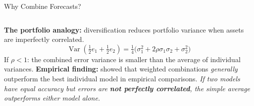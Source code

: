\documentclass[aspectratio=169, 11pt]{beamer}
\begin{document}
\begin{frame}{Why Combine Forecasts?}
  \begin{columns}[T]
      \textbf{The portfolio analogy:} diversification reduces portfolio
      variance when assets are imperfectly correlated.
      \[
        \operatorname{Var}\!\left(\tfrac{1}{2}e_1 + \tfrac{1}{2}e_2\right)
        = \tfrac{1}{4}\bigl(\sigma_1^2 + 2\rho\sigma_1\sigma_2 + \sigma_2^2\bigr)
      \]
      If $\rho < 1$: the combined error variance is smaller than
      the average of individual variances.
      \vspace{0.05cm}
      \textbf{Empirical finding:} \textcite{BatesGranger1969} showed
      that weighted combinations \emph{generally} outperform
      the best individual model in empirical comparisons.
      \textit{If two models have equal accuracy but errors are
      \textbf{not perfectly correlated}, the simple average
      outperforms either model alone.}
      \vspace{0.1cm}
  \end{columns}
\end{frame}
\end{document}

